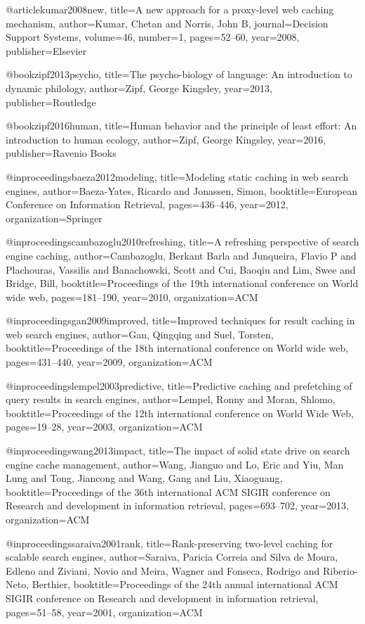 @article{kumar2008new,
	title={A new approach for a proxy-level web caching mechanism},
	author={Kumar, Chetan and Norris, John B},
	journal={Decision Support Systems},
	volume={46},
	number={1},
	pages={52--60},
	year={2008},
	publisher={Elsevier}
}

@book{zipf2013psycho,
	title={The psycho-biology of language: An introduction to dynamic philology},
	author={Zipf, George Kingsley},
	year={2013},
	publisher={Routledge}
}

@book{zipf2016human,
	title={Human behavior and the principle of least effort: An introduction to human ecology},
	author={Zipf, George Kingsley},
	year={2016},
	publisher={Ravenio Books}
}

@inproceedings{baeza2012modeling,
	title={Modeling static caching in web search engines},
	author={Baeza-Yates, Ricardo and Jonassen, Simon},
	booktitle={European Conference on Information Retrieval},
	pages={436--446},
	year={2012},
	organization={Springer}
}

@inproceedings{cambazoglu2010refreshing,
	title={A refreshing perspective of search engine caching},
	author={Cambazoglu, Berkant Barla and Junqueira, Flavio P and Plachouras, Vassilis and Banachowski, Scott and Cui, Baoqiu and Lim, Swee and Bridge, Bill},
	booktitle={Proceedings of the 19th international conference on World wide web},
	pages={181--190},
	year={2010},
	organization={ACM}
}

@inproceedings{gan2009improved,
	title={Improved techniques for result caching in web search engines},
	author={Gan, Qingqing and Suel, Torsten},
	booktitle={Proceedings of the 18th international conference on World wide web},
	pages={431--440},
	year={2009},
	organization={ACM}
}

@inproceedings{lempel2003predictive,
	title={Predictive caching and prefetching of query results in search engines},
	author={Lempel, Ronny and Moran, Shlomo},
	booktitle={Proceedings of the 12th international conference on World Wide Web},
	pages={19--28},
	year={2003},
	organization={ACM}
}

@inproceedings{wang2013impact,
	title={The impact of solid state drive on search engine cache management},
	author={Wang, Jianguo and Lo, Eric and Yiu, Man Lung and Tong, Jiancong and Wang, Gang and Liu, Xiaoguang},
	booktitle={Proceedings of the 36th international ACM SIGIR conference on Research and development in information retrieval},
	pages={693--702},
	year={2013},
	organization={ACM}
}

@inproceedings{saraiva2001rank,
	title={Rank-preserving two-level caching for scalable search engines},
	author={Saraiva, Paricia Correia and Silva de Moura, Edleno and Ziviani, Novio and Meira, Wagner and Fonseca, Rodrigo and Riberio-Neto, Berthier},
	booktitle={Proceedings of the 24th annual international ACM SIGIR conference on Research and development in information retrieval},
	pages={51--58},
	year={2001},
	organization={ACM}
}

